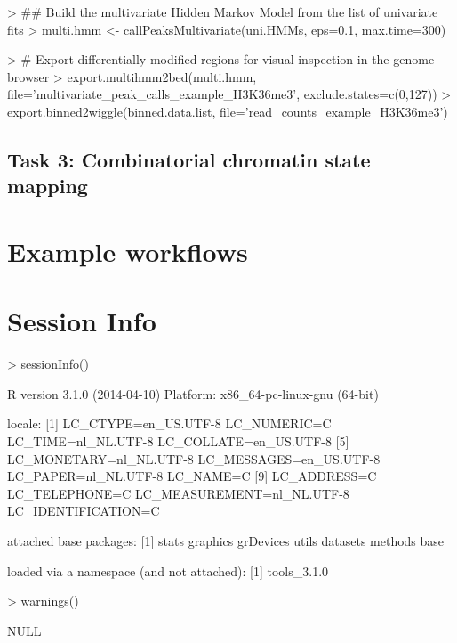 \documentclass[11pt]{article}
\begin{document}
\begin{scriptsize}
\begin{Schunk}
\begin{Sinput}
> ## Build the multivariate Hidden Markov Model from the list of univariate fits
> multi.hmm <- callPeaksMultivariate(uni.HMMs, eps=0.1, max.time=300)
\end{Sinput}
\end{Schunk}
\end{scriptsize}

\begin{scriptsize}
\begin{Schunk}
\begin{Sinput}
> # Export differentially modified regions for visual inspection in the genome browser
> export.multihmm2bed(multi.hmm, file='multivariate_peak_calls_example_H3K36me3', exclude.states=c(0,127))
> export.binned2wiggle(binned.data.list, file='read_counts_example_H3K36me3')
\end{Sinput}
\end{Schunk}
\end{scriptsize}


\subsection{Task 3: Combinatorial chromatin state mapping}

\section{Example workflows}

\section{Session Info}
\begin{scriptsize}
\begin{Schunk}
\begin{Sinput}
> sessionInfo()
\end{Sinput}
\begin{Soutput}
R version 3.1.0 (2014-04-10)
Platform: x86_64-pc-linux-gnu (64-bit)

locale:
 [1] LC_CTYPE=en_US.UTF-8       LC_NUMERIC=C               LC_TIME=nl_NL.UTF-8        LC_COLLATE=en_US.UTF-8    
 [5] LC_MONETARY=nl_NL.UTF-8    LC_MESSAGES=en_US.UTF-8    LC_PAPER=nl_NL.UTF-8       LC_NAME=C                 
 [9] LC_ADDRESS=C               LC_TELEPHONE=C             LC_MEASUREMENT=nl_NL.UTF-8 LC_IDENTIFICATION=C       

attached base packages:
[1] stats     graphics  grDevices utils     datasets  methods   base     

loaded via a namespace (and not attached):
[1] tools_3.1.0
\end{Soutput}
\begin{Sinput}
> warnings()
\end{Sinput}
\begin{Soutput}
NULL
\end{Soutput}
\end{Schunk}
\end{scriptsize}
\end{document}
